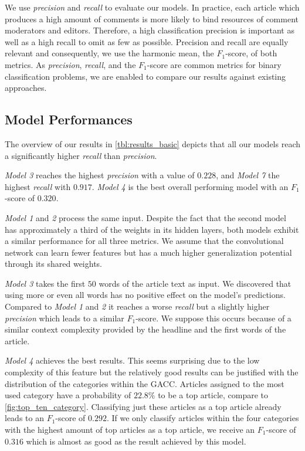 We use \textit{precision} and \textit{recall} to evaluate our models. 
In practice, each article which produces a high amount of comments is more likely to bind resources of comment moderators and editors. Therefore, a high classification precision is important as well as a high recall to omit as few as possible.
Precision and recall are equally relevant and consequently, we use the harmonic mean, the $F_1$-score, of both metrics. As \textit{precision}, \textit{recall}, and the $F_1$-score are common metrics for binary classification problems, we are enabled to compare our results against existing approaches.

\subsection{Model Performances}
The overview of our results in \autoref{tbl:results_basic} depicts that all our models reach a significantly higher \textit{recall} than \textit{precision}.

\textit{Model 3} reaches the highest \textit{precision} with a value of $0.228$, and \textit{Model 7} the highest \textit{recall} with $0.917$. \textit{Model 4} is the best overall performing model with an $F_1$-score of $0.320$. 



\textit{Model 1} and \textit{2} process the same input. Despite the fact that the second model has approximately a third of the weights in its hidden layers, both models exhibit a similar performance for all three metrics.
We assume that the convolutional network can learn fewer features but has a much higher generalization potential through its shared weights.

\textit{Model 3} takes the first $50$ words of the article text as input. We discovered that using more or even all words has no positive effect on the model's predictions.
Compared to \textit{Model 1} and \textit{2} it reaches a worse \textit{recall} but a slightly higher \textit{precision} which leads to a similar $F_1$-score.
We suppose this occurs because of a similar context complexity provided by the headline and the first words of the article.

\textit{Model 4} achieves the best results. This seems surprising due to the low complexity of this feature but the relatively good results can be justified with the distribution of the categories within the GACC. 
Articles assigned to the most used category have a probability of $22.8\%$ to be a top article, compare to \autoref{fig:top_ten_category}. Classifying just these articles as a top article already leads to an $F_1$-score of $0.292$. 
If we only classify articles within the four categories with the highest amount of top articles as a top article, we receive an $F_1$-score of $0.316$ which is almost as good as the result achieved by this model.

